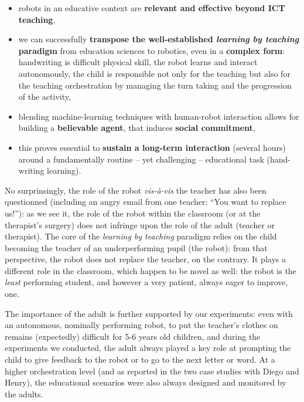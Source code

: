 \documentclass{article}
\begin{document}
\begin{itemize}
    \item robots in an educative context are \textbf{relevant and effective beyond ICT
        teaching},

    \item we can successfully \textbf{transpose the well-established
        \emph{learning by teaching} paradigm} from education sciences to
        robotics, even in a \textbf{complex form}: handwriting is difficult
        physical skill, the robot learns and interact autonomously, the child is
        responsible not only for the teaching but also for the teaching
        orchestration by managing the turn taking and the progression of the
        activity,

    \item blending machine-learning techniques with human-robot interaction
        allows for building a \textbf{believable agent}, that induces
        \textbf{social commitment},

    \item this proves essential to \textbf{sustain a long-term interaction} (several
        hours) around a fundamentally routine -- yet challenging -- educational
        task (hand-writing learning).
\end{itemize}


No surprinsingly, the role of the robot \textit{vis-à-vis} the teacher has also
been questionned (including an angry email from one teacher: ``You want to
replace us!''): as we see it, the role of the robot within the classroom (or at
the therapist's surgery) does not infringe upon the role of the adult (teacher
or therapist).  The core of the \emph{learning by teaching} paradigm relies on
the child becoming the teacher of an underperforming pupil (the robot): from
that perspective, the robot does not replace the teacher, on the contrary. It
plays a different role in the classroom, which happen to be novel as well: the
robot is the \emph{least} performing student, and however a very patient, always
eager to improve, one.

The importance of the adult is further supported by our experiments: even with
an autonomous, nominally performing robot, to put the teacher's clothes on
remains (expectedly) difficult for 5-6 years old children, and during the
experiments we conducted, the adult always played a key role at prompting the
child to give feedback to the robot or to go to the next letter or word.  At a
higher orchestration level (and as reported in the two case studies with Diego
and Henry), the educational scenarios were also always designed and monitored by
the adults.
\end{document}
